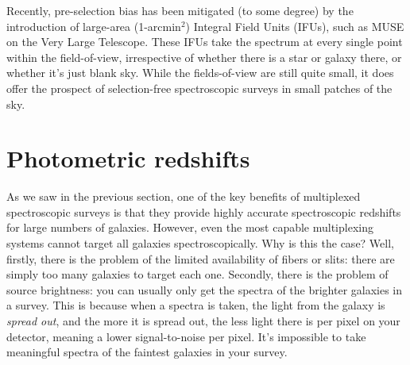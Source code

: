 \documentclass[11pt]{article}
\begin{document}
Recently, pre-selection bias has been mitigated (to some degree) by
the introduction of large-area (1-arcmin$^2$) Integral Field Units
(IFUs), such as MUSE on the Very Large Telescope. These IFUs take the
spectrum at every single point within the field-of-view, irrespective
of whether there is a star or galaxy there, or whether it's just blank
sky. While the fields-of-view are still quite small, it does offer the
prospect of selection-free spectroscopic surveys in small patches of
the sky.

\section{Photometric redshifts}
\label{photoz}
As we saw in the previous section, one of the key benefits of
multiplexed spectroscopic surveys is that they provide highly accurate
spectroscopic redshifts for large numbers of galaxies. However, even
the most capable multiplexing systems cannot target all galaxies
spectroscopically. Why is this the case? Well, firstly, there is the
problem of the limited availability of fibers or slits: there are simply
too many galaxies to target each one. Secondly, there is the problem
of source brightness: you can usually only get the spectra of the
brighter galaxies in a survey. This is because when a spectra is
taken, the light from the galaxy is {\it spread out}, and the more it
is spread out, the less light there is per pixel on your detector,
meaning a lower signal-to-noise per pixel. It's impossible to take
meaningful spectra of the faintest galaxies in your survey.
\end{document}
